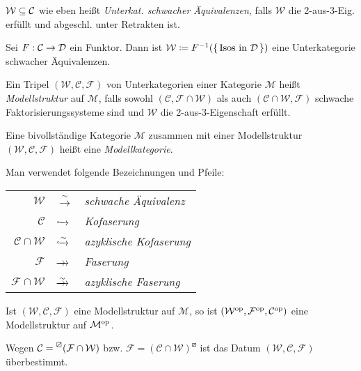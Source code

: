 \documentclass{cheat-sheet}
\newcommand{\nspace}[1]{\foreach \i in {1,...,#1}{ \! }} %
\newcommand{\xtwoheadrightarrow}[1]{\xrightarrow{#1}\nspace{8}\to\,\,} %
\newcommand{\lhhe}{\boxslash} %
\newcommand{\Weak}{\mathcal{W}} %
\newcommand{\Cof}{\mathcal{C}} %
\newcommand{\Fib}{\mathcal{F}} %
\newcommand{\ModC}{\mathcal{M}} %
\begin{document}
\begin{defn}
  $\Weak \subseteq \Cat$ wie eben heißt \emph{Unterkat. schwacher Äquivalenzen}, falls $\Weak$ die 2-aus-3-Eig. erfüllt und abgeschl. unter Retrakten ist.
\end{defn}

\begin{bsp}
  Sei $F : \mathcal{C} \to \mathcal{D}$ ein Funktor. Dann ist $\Weak \coloneqq F^{-1}(\{ \, \text{Isos in $\Dat$} \, \})$ eine Unterkategorie schwacher Äquivalenzen.
\end{bsp}

\begin{defn}
  Ein Tripel $(\Weak, \Cof, \Fib)$ von Unterkategorien einer Kategorie $\ModC$ heißt \emph{Modellstruktur} auf $\ModC$, falls sowohl $(\Cof, \Fib \cap \Weak)$ als auch $(\Cof \cap \Weak, \Fib)$ schwache Faktorisierungssysteme sind und $\Weak$ die 2-aus-3-Eigenschaft erfüllt.
\end{defn}

\begin{defn}
  Eine bivollständige Kategorie $\ModC$ zusammen mit einer Modellstruktur $(\Weak, \Cof, \Fib)$ heißt eine \emph{Modellkategorie}.
\end{defn}

\begin{sprech}
  Man verwendet folgende Bezeichnungen und Pfeile:
  \begin{center}
    \begin{tabular}{r l l}
      $\Weak$ & $\xrightarrow{{\sim}}$ & \emph{schwache Äquivalenz} \\
      $\Cof$ & $\xhookrightarrow{\phantom{{\sim}}}$ & \emph{Kofaserung} \\
      $\Cof \cap \Weak$ & $\xhookrightarrow{{\sim}}$ & \emph{azyklische Kofaserung} \\
      $\Fib$ & $\xtwoheadrightarrow{\phantom{{\sim}}}$ & \emph{Faserung} \\
      $\Fib \cap \Weak$ & $\xtwoheadrightarrow{{\sim}}$ & \emph{azyklische Faserung}
    \end{tabular}
  \end{center}
\end{sprech}

\begin{bem}
  Ist $(\Weak, \Cof, \Fib)$ eine Modellstruktur auf $\ModC$, so ist $(\Weak^\op, \Fib^\op, \Cof^\op)$ eine Modellstruktur auf $\ModC^\op$.
\end{bem}

\begin{bem}
  Wegen $\Cof = \prescript{\lhhe}{} (\Fib \cap \Weak)$ bzw. $\Fib = (\Cof \cap \Weak)^\lhhe$ ist das Datum $(\Weak, \Cof, \Fib)$ überbestimmt.
\end{bem}
\end{document}
